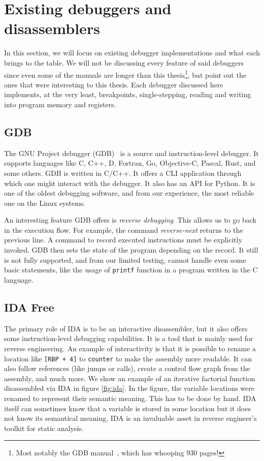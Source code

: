 \section{Existing debuggers and disassemblers}
In this section, we will focus on existing debugger implementations and what
each brings to the table. We will not be discussing every feature of said
debuggers since even some of the manuals are longer than this
thesis\footnote{Most notably the GDB manual~\cite{gdb-manual}, which has
whooping 930 pages!}, but point out the ones that were interesting to this
thesis. Each debugger discussed here implements, at the very least,
breakpoints, single-stepping, reading and writing into program memory and
registers.

\subsection{GDB}
The GNU Project debugger (GDB)~\cite{gdb-manual} is a source and
instruction-level debugger. It supports languages like C, C++, D, Fortran, Go,
Objective-C, Pascal, Rust, and some others. GDB is written in C/C++. It offers
a CLI application through which one might interact with the debugger. It also
has an API for Python. It is one of the oldest debugging software, and from our
experience, the most reliable one on the Linux systems.

An interesting feature GDB offers is \textit{reverse debugging}. This allows us
to go back in the execution flow. For example, the command
\textit{reverse-next} returns to the previous line. A command to record
executed instructions must be explicitly invoked. GDB then sets the state of
the program depending on the record. It still is not fully supported, and from
our limited testing, cannot handle even some basic statements, like the usage
of \texttt{printf} function in a program written in the C language.

\subsection{IDA Free}
The primary role of IDA is to be an interactive disassembler, but it also
offers some instruction-level debugging capabilities. It is a tool that is
mainly used for reverse engineering. An example of interactivity is that it is
possible to rename a location like \texttt{[RBP + 4]} to \texttt{counter} to
make the assembly more readable. It can also follow references (like jumps or
calls), create a control flow graph from the assembly, and much more. We show
an example of an iterative factorial function disassembled via IDA in figure
\ref{fig:ida}. In the figure, the variable locations were renamed to represent
their semantic meaning. This has to be done by hand. IDA itself can sometimes
know that a variable is stored in some location but it does not know its
semantical meaning. IDA is an invaluable asset in reverse engineer's toolkit
for static analysis.

